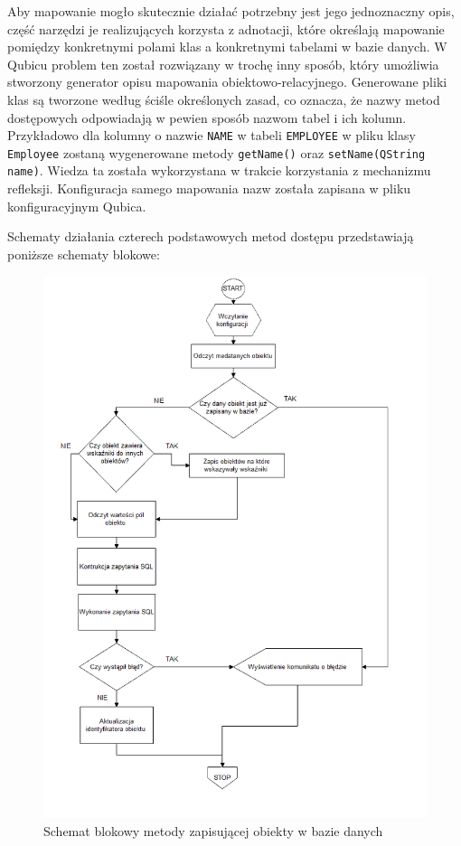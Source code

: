 \documentclass[12pt]{report}
\begin{document}
Aby mapowanie mogło skutecznie działać potrzebny jest jego jednoznaczny opis, część narzędzi je realizujących korzysta z adnotacji, które określają mapowanie pomiędzy
konkretnymi polami klas a konkretnymi tabelami w bazie danych. W Qubicu problem ten został rozwiązany w trochę inny sposób, który umożliwia stworzony generator opisu
mapowania obiektowo-relacyjnego. Generowane pliki klas są tworzone według ściśle określonych zasad, co oznacza, że nazwy metod dostępowych odpowiadają w pewien
sposób nazwom tabel i ich kolumn. Przykładowo dla kolumny o nazwie {\tt NAME} w tabeli {\tt EMPLOYEE} w pliku klasy {\tt Employee} zostaną wygenerowane metody 
{\tt getName()} oraz {\tt setName(QString name)}. Wie\-dza ta została wykorzystana w trakcie korzystania z mechanizmu refleksji. Konfiguracja samego mapowania nazw
została zapisana w pliku konfiguracyjnym Qubica.

Schematy działania czterech podstawowych metod dostępu przedstawiają po\-niższe schematy blokowe:

\newpage
\begin{figure}[H]
\centering
\includegraphics[width=\textwidth]{resources/store_schema.png}
\caption{Schemat blokowy metody zapisującej obiekty w bazie danych}
\end{figure}
\end{document}
